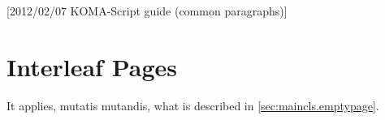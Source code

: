 %
%
%
%
%
%
%
%
% 
%
%
%
%

[2012/02/07 KOMA-Script guide (common paragraphs)]


\makeatletter
{}%
%
%
%
\makeatother


\section{Interleaf Pages}
\label{sec:\csname label@base\endcsname.emptypage}%
\ifshortversion\IgnoreThisfalse{}\fi%
\ifIgnoreThis %
It applies, mutatis mutandis, what is described in
\autoref{sec:maincls.emptypage}.
\else %
%

